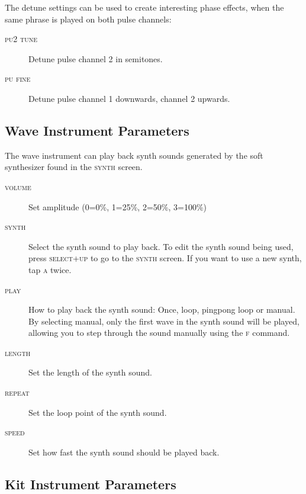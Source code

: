 The detune settings can be used to create interesting phase effects, when the same phrase is played on both pulse channels:

\begin{description}
	\item[\textsc{pu2 tune}] Detune pulse channel 2 in semitones.
	\item[\textsc{pu fine}] Detune pulse channel 1 downwards, channel 2 upwards.
\end{description}

\subsection{Wave Instrument Parameters}

The wave instrument can play back synth sounds generated by the soft synthesizer found in the \textsc{synth} screen.

\begin{figure}[hbtp]
	\begin{center}
	\end{center}
\end{figure}

\begin{description}
	\item[\textsc{volume}] Set amplitude (0=0\%, 1=25\%, 2=50\%, 3=100\%)
	\item[\textsc{synth}] Select the synth sound to play back. To edit the synth sound being used, press \textsc{select+up} to go to the \textsc{synth} screen. If you want to use a new synth, tap \textsc{a} twice.
	\item[\textsc{play}] How to play back the synth sound: Once, loop, pingpong loop or manual. By selecting manual, only the first wave in the synth sound will be played, allowing you to step through the sound manually using the \textsc{f} command.
	\item[\textsc{length}] Set the length of the synth sound.
	\item[\textsc{repeat}] Set the loop point of the synth sound.
	\item[\textsc{speed}] Set how fast the synth sound should be played back.
\end{description}

\subsection{Kit Instrument Parameters}


